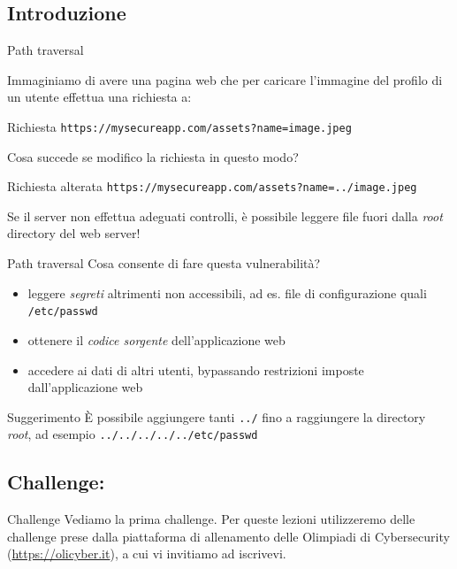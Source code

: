 \documentclass[12pt]{beamer}
\begin{document}
\subsection{Introduzione}
\begin{frame}{Path traversal}

Immaginiamo di avere una pagina web che per caricare l'immagine del profilo di un utente effettua una richiesta a:

\begin{block}{Richiesta}
\texttt{https://mysecureapp.com/assets?name=image.jpeg}
\end{block}

\pause
Cosa succede se modifico la richiesta in questo modo?

\begin{exampleblock}{Richiesta alterata}
\texttt{https://mysecureapp.com/assets?name=../image.jpeg}
\end{exampleblock}
    
\pause

Se il server non effettua adeguati controlli, è possibile leggere file fuori dalla \textit{root} directory del web server!

\end{frame}
\begin{frame}{Path traversal}
Cosa consente di fare questa vulnerabilità?

\pause
\begin{itemize}
    \item leggere \textit{segreti} altrimenti non accessibili, ad es. file di configurazione quali \texttt{/etc/passwd}
    \pause
    \item ottenere il \textit{codice sorgente} dell'applicazione web
    \pause
    \item accedere ai dati di altri utenti, bypassando restrizioni imposte dall'applicazione web
    \pause
\end{itemize}

\begin{alertblock}{Suggerimento}
È possibile aggiungere tanti \texttt{../} fino a raggiungere la directory \textit{root}, ad esempio \texttt{../../../../../etc/passwd}
\end{alertblock}

\end{frame}
\subsection{Challenge: }
\begin{frame}{Challenge}
Vediamo la prima challenge. Per queste lezioni utilizzeremo delle challenge 
prese dalla piattaforma di allenamento delle Olimpiadi di Cybersecurity (\url{https://olicyber.it}), 
a cui vi invitiamo ad iscrivevi.
\end{frame}
\end{document}
